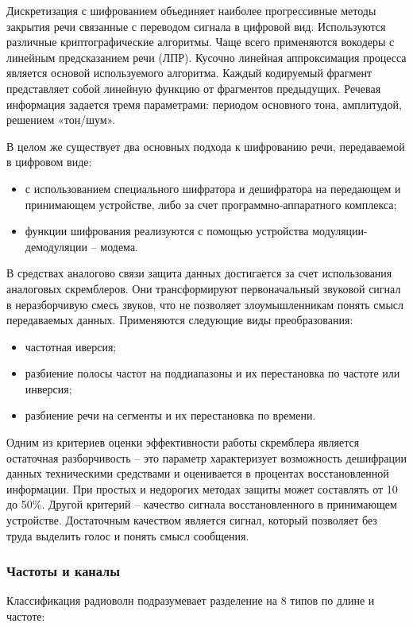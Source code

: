 \documentclass[a4paper]{report}
\begin{document}
Дискретизация с шифрованием объединяет наиболее прогрессивные методы закрытия речи связанные с переводом сигнала в цифровой вид. Используются различные криптографические алгоритмы. Чаще всего применяются вокодеры с линейным предсказанием речи (ЛПР). Кусочно линейная аппроксимация процесса является основой используемого алгоритма. Каждый кодируемый фрагмент представляет собой линейную функцию от фрагментов предыдущих. Речевая информация задается тремя параметрами: периодом основного тона, амплитудой, решением «тон/шум».

В целом же существует два основных подхода к шифрованию речи, передаваемой в цифровом виде:

\begin{itemize}
\item с использованием специального шифратора и дешифратора на передающем и принимающем устройстве, либо за счет программно-аппаратного комплекса;
\item функции шифрования реализуются с помощью устройства модуляции-демодуляции – модема.
\end{itemize}

В средствах аналогово связи защита данных достигается за счет использования аналоговых скремблеров. Они трансформируют первоначальный звуковой сигнал в неразборчивую смесь звуков, что не позволяет злоумышленникам понять смысл передаваемых данных. Применяются следующие виды преобразования:

\begin{itemize}
\item частотная иверсия;
\item разбиение полосы частот на поддиапазоны и их перестановка по частоте или инверсия;
\item разбиение речи на сегменты и их перестановка по времени.
\end{itemize}

Одним из критериев оценки эффективности работы скремблера является остаточная разборчивость – это параметр характеризует возможность дешифрации данных техническими средствами и оценивается в процентах восстановленной информации. При простых и недорогих методах защиты может составлять от 10 до 50\%. Другой критерий – качество сигнала восстановленного в принимающем устройстве. Достаточным качеством является сигнал, который позволяет без труда выделить голос и понять смысл сообщения.

\subsubsection{Частоты и каналы}
Классификация радиоволн подразумевает разделение на 8 типов по длине и частоте:
\end{document}
